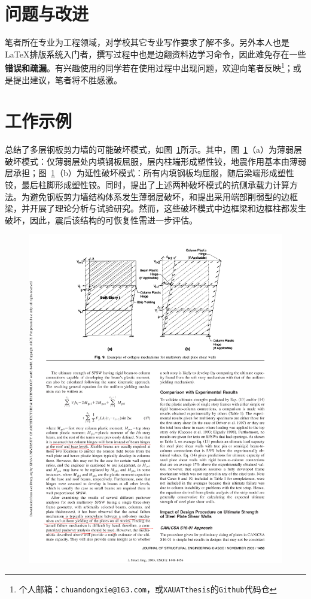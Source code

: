 \section{问题与改进}
笔者所在专业为工程领域，对学校其它专业写作要求了解不多。另外本人也是\LaTeX{}排版系统入门者，撰写过程中也是边翻资料边学习命令，因此难免存在一些\textbf{\songti 错误和疏漏}。有兴趣使用的同学若在使用过程中出现问题，欢迎向笔者反映\footnote{个人邮箱：\texttt{chuandongxie@163.com}，或\texttt{XAUATthesis}的\texttt{Github}代码仓}；或是提出建议，笔者将不胜感激。

\section{工作示例}


总结了多层钢板剪力墙的可能破坏模式，如图~\ref{fig:Berman2003}所示。其中，图~\ref{fig:Berman2003}（a）为薄弱层破坏模式：仅薄弱层处内填钢板屈服，层内柱端形成塑性铰，地震作用基本由薄弱层承担；图~\ref{fig:Berman2003}（b）为延性破坏模式：所有内填钢板均屈服，随后梁端形成塑性铰，最后柱脚形成塑性铰。同时，提出了上述两种破坏模式的抗侧承载力计算方法。为避免钢板剪力墙结构体系发生薄弱层破坏，和提出采用端部削弱型的边框梁，并开展了理论分析与试验研究。然而，这些破坏模式中边框梁和边框柱都发生破坏，因此，震后该结构的可恢复性需进一步评估。

\begin{figure}[H] 
  \centering
  \includegraphics[width=12cm]{Berman2003.pdf}
  \label{fig:Berman2003}
\end{figure}

